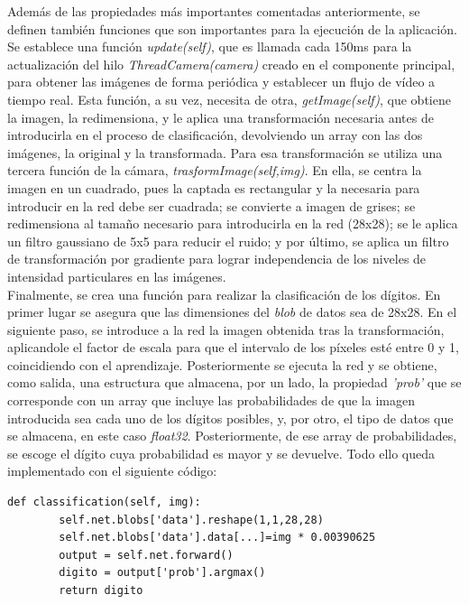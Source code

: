 Además de las propiedades más importantes comentadas anteriormente, se definen también funciones que son importantes para la ejecución de la aplicación. Se establece una función \textit{update(self)}, que es llamada cada 150ms para la actualización del hilo \textit{ThreadCamera(camera)} creado en el componente principal, para obtener las imágenes de forma periódica y establecer un flujo de vídeo a tiempo real. Esta función, a su vez, necesita de otra, \textit{getImage(self)}, que obtiene la imagen, la redimensiona, y le aplica una transformación necesaria antes de introducirla en el proceso de clasificación, devolviendo un array con las dos imágenes, la original y la transformada. Para esa transformación se utiliza una tercera función de la cámara, \textit{trasformImage(self,img)}. En ella, se centra la imagen en un cuadrado, pues la captada es rectangular y la necesaria para introducir en la red debe ser cuadrada; se convierte a imagen de grises; se redimensiona al tamaño necesario para introducirla en la red (28x28); se le aplica un filtro gaussiano de 5x5 para reducir el ruido; y por último, se aplica un filtro de transformación por gradiente para lograr independencia de los niveles de intensidad particulares en las imágenes.\\

Finalmente, se crea una función para realizar la clasificación de los dígitos. En primer lugar se asegura que las dimensiones del \textit{blob} de datos sea de 28x28. En el siguiente paso, se introduce a la red la imagen obtenida tras la transformación, aplicandole el factor de escala para que el intervalo de los píxeles esté entre 0 y 1, coincidiendo con el aprendizaje. Posteriormente se ejecuta la red y se obtiene, como salida, una estructura que almacena, por un lado, la propiedad \textit{'prob'} que se corresponde con un array que incluye las probabilidades de que la imagen introducida sea cada uno de los dígitos posibles, y, por otro, el tipo de datos que se almacena, en este caso \textit{float32}. Posteriormente, de ese array de probabilidades, se escoge el dígito cuya probabilidad es mayor y se devuelve. Todo ello queda implementado con el siguiente código:
\vspace{10pt}
\begin{lstlisting}[frame=single]
	def classification(self, img):
		self.net.blobs['data'].reshape(1,1,28,28)
		self.net.blobs['data'].data[...]=img * 0.00390625
		output = self.net.forward()
		digito = output['prob'].argmax()
		return digito
\end{lstlisting}

